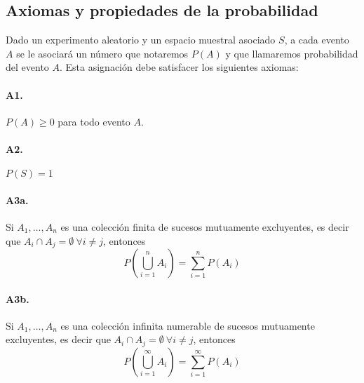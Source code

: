 \subsection{Axiomas y propiedades de la probabilidad}
Dado un experimento aleatorio y un espacio muestral asociado $S$, a cada evento $A$ se le asociará un número que notaremos $P(A)$ y que llamaremos probabilidad del evento $A$. Esta asignación debe satisfacer los siguientes axiomas:

\paragraph{A1.} $P(A)\geq 0$ para todo evento $A$.
\paragraph{A2.} $P(S) = 1$
\paragraph{A3a.} Si $A_1,\dots,A_n$ es una colección finita de sucesos mutuamente excluyentes, es decir que $A_i\cap A_j = \emptyset~\forall i\neq j$, entonces
$$P\left(\bigcup_{i=1}^n A_i\right) = \sum_{i=1}^n P(A_i)$$
\paragraph{A3b.} Si $A_1,\dots,A_n$ es una colección infinita numerable de sucesos mutuamente excluyentes, es decir que $A_i\cap A_j = \emptyset~\forall i\neq j$, entonces
$$P\left(\bigcup_{i=1}^\infty A_i\right) = \sum_{i=1}^\infty P(A_i)$$

